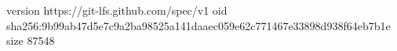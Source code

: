 version https://git-lfs.github.com/spec/v1
oid sha256:9b99ab47d5e7c9a2ba98525a141daaec059e62c771467e33898d938f64eb7b1e
size 87548
